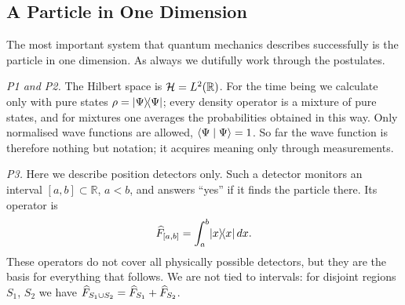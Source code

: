 
\subsection{A Particle in One Dimension}
The most important system that quantum mechanics describes successfully is the particle in one dimension. As always we dutifully work through the postulates.

\emph{P1 and P2.} The Hilbert space is $\mathcal{H} = L^2(\mathbb{R})$. For the time being we calculate only with pure states $\rho = \lvert \Psi \rangle\!\langle \Psi \rvert$; every density operator is a mixture of pure states, and for mixtures one averages the probabilities obtained in this way. Only normalised wave functions are allowed, $\langle \Psi \mid \Psi \rangle = 1$. So far the wave function is therefore nothing but notation; it acquires meaning only through measurements.


\emph{P3.} Here we describe position detectors only. Such a detector monitors an interval $[a,b]\subset\mathbb{R}$, $a<b$, and answers ``yes'' if it finds the particle there. Its operator is
\begin{equation}\label{eq:ortsdetektor}
	\widehat{F}_{[a,b]} = \int_a^b \lvert x \rangle\!\langle x \rvert\,dx.
\end{equation}
These operators do not cover all physically possible detectors, but they are the basis for everything that follows. We are not tied to intervals: for disjoint regions $S_1$, $S_2$ we have $\widehat{F}_{S_1\cup S_2} = \widehat{F}_{S_1} + \widehat{F}_{S_2}$.

